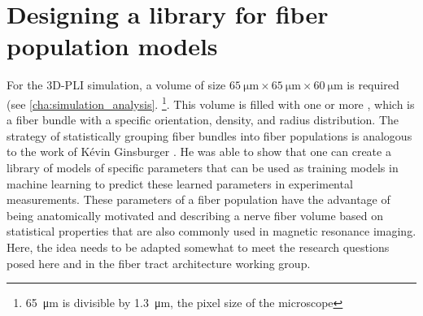 \section{Designing a library for fiber population models}
%
For the \ac{3D-PLI} simulation, a volume of size $\SI{65}{\micro\meter} \times \SI{65}{\micro\meter} \times \SI{60}{\micro\meter}$ is required (see \cref{cha:simulation_analysis}. \footnote{\SI{65}{\micro\meter} is divisible by \SI{1.3}{\micro\meter}, the pixel size of the microscope}.
This volume is filled with one or more , which is a fiber bundle with a specific orientation, density, and radius distribution.
The strategy of statistically grouping fiber bundles into fiber populations is analogous to the work of K{\'{e}}vin Ginsburger \cite{Ginsburger2018,Ginsburger2019,ginsburgerDis2019}.
He was able to show that one can create a library of models of specific parameters that can be used as training models in machine learning to predict these learned parameters in experimental measurements.
These parameters of a fiber population have the advantage of being anatomically motivated and describing a nerve fiber volume based on statistical properties that are also commonly used in magnetic resonance imaging.
Here, the idea needs to be adapted somewhat to meet the research questions posed here and in the fiber tract architecture working group.
%
% 
% 
